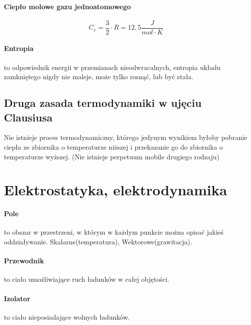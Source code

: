 \documentclass{article}
\begin{document}
            \paragraph{Ciepło molowe gazu jednoatomowego}
            \begin{equation}
                C_v = \frac{3}{2} \cdotp R = 12,5 \frac{J}{mol \cdotp K}
            \end{equation}

            \paragraph{Entropia} to odpowiednik energii w przemianach nieodwracalnych,
                entropia układu zamkniętego nigdy nie maleje, może tylko rosnąć,
                lub być stała.
        
        \subsection{Druga zasada termodynamiki w ujęciu Clausiusa}
            Nie istnieje proces termodynamiczny, którego jedynym wynikiem byłoby
            pobranie ciepła ze zbiornika o temperaturze niższej i przekazanie go do
            zbiornika o temperaturze wyższej.
            (Nie istnieje perpetuum mobile drugiego rodzaju)

    \section{Elektrostatyka, elektrodynamika}
        \paragraph{Pole}
            to obszar w przestrzeni, w którym w każdym punkcie można
            opisać jakieś oddziaływanie.
            Skalarne(temperatura), Wektorowe(grawitacja).

        \paragraph{Przewodnik}
            to ciało umożliwiające ruch ładunków w całej objętości.

        \paragraph{Izolator}
            to ciało nieposiadające wolnych ładunków.
        
\end{document}
